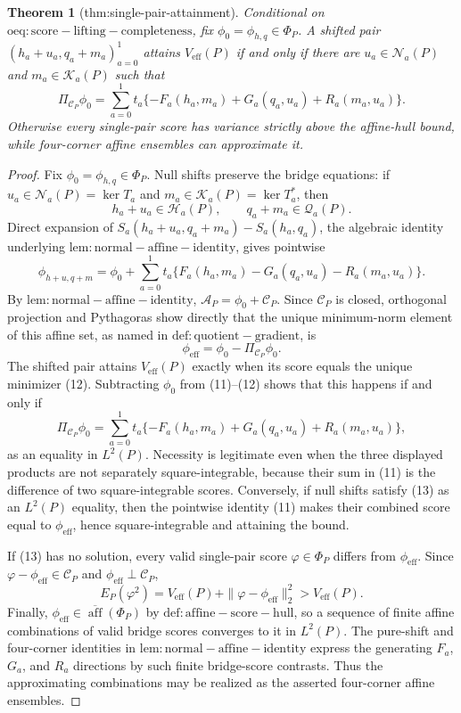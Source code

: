 \documentclass{article}
\newtheorem{theorem}{Theorem}
\begin{document}
\begin{theorem}[thm:single-pair-attainment]\label{thm:single-pair-attainment}
Conditional on \(\mathrm{oeq:score-lifting-completeness}\), fix \(\phi_0=\phi_{h,q}\in\Phi_P\). A shifted pair \((h_a+u_a,q_a+m_a)_{a=0}^1\) attains \(V_{\mathrm{eff}}(P)\) if and only if there are \(u_a\in\mathcal N_a(P)\) and \(m_a\in\mathcal K_a(P)\) such that \[\Pi_{\mathcal C_P}\phi_0=\sum_{a=0}^1t_a\{-F_a(h_a,m_a)+G_a(q_a,u_a)+R_a(m_a,u_a)\}.\] Otherwise every single-pair score has variance strictly above the affine-hull bound, while four-corner affine ensembles can approximate it.
\end{theorem}
\begin{proof}
Fix \(\phi_0=\phi_{h,q}\in\Phi_P\).  Null shifts preserve the bridge equations: if \(u_a\in\mathcal N_a(P)=\ker T_a\) and \(m_a\in\mathcal K_a(P)=\ker T_a^*\), then
\[
 h_a+u_a\in\mathcal H_a(P),
 \qquad
 q_a+m_a\in\mathcal Q_a(P).
\]
Direct expansion of \(S_a(h_a+u_a,q_a+m_a)-S_a(h_a,q_a)\), the algebraic identity underlying \(\mathrm{lem:normal-affine-identity}\), gives pointwise
\[
 \phi_{h+u,q+m}
 =\phi_0+
 \sum_{a=0}^1t_a\{F_a(h_a,m_a)-G_a(q_a,u_a)-R_a(m_a,u_a)\}.          \tag{11}
\]
By \(\mathrm{lem:normal-affine-identity}\), \(\mathcal A_P=\phi_0+\mathcal C_P\).  Since \(\mathcal C_P\) is closed, orthogonal projection and Pythagoras show directly that the unique minimum-norm element of this affine set, as named in \(\mathrm{def:quotient-gradient}\), is
\[
 \phi_{\mathrm{eff}}=\phi_0-\Pi_{\mathcal C_P}\phi_0.            \tag{12}
\]
The shifted pair attains \(V_{\mathrm{eff}}(P)\) exactly when its score equals the unique minimizer (12).  Subtracting \(\phi_0\) from (11)--(12) shows that this happens if and only if
\[
 \Pi_{\mathcal C_P}\phi_0
 =\sum_{a=0}^1t_a\{-F_a(h_a,m_a)+G_a(q_a,u_a)+R_a(m_a,u_a)\},        \tag{13}
\]
as an equality in \(L^2(P)\).  Necessity is legitimate even when the three displayed products are not separately square-integrable, because their sum in (11) is the difference of two square-integrable scores.  Conversely, if null shifts satisfy (13) as an \(L^2(P)\) equality, then the pointwise identity (11) makes their combined score equal to \(\phi_{\mathrm{eff}}\), hence square-integrable and attaining the bound.

If (13) has no solution, every valid single-pair score \(\varphi\in\Phi_P\) differs from \(\phi_{\mathrm{eff}}\).  Since \(\varphi-\phi_{\mathrm{eff}}\in\mathcal C_P\) and \(\phi_{\mathrm{eff}}\perp\mathcal C_P\),
\[
 E_P(\varphi^2)
 =V_{\mathrm{eff}}(P)+\|\varphi-\phi_{\mathrm{eff}}\|_2^2
 >V_{\mathrm{eff}}(P).                                             \tag{14}
\]
Finally, \(\phi_{\mathrm{eff}}\in\overline{\operatorname{aff}}(\Phi_P)\) by \(\mathrm{def:affine-score-hull}\), so a sequence of finite affine combinations of valid bridge scores converges to it in \(L^2(P)\).  The pure-shift and four-corner identities in \(\mathrm{lem:normal-affine-identity}\) express the generating \(F_a\), \(G_a\), and \(R_a\) directions by such finite bridge-score contrasts.  Thus the approximating combinations may be realized as the asserted four-corner affine ensembles.
\end{proof}
\end{document}
